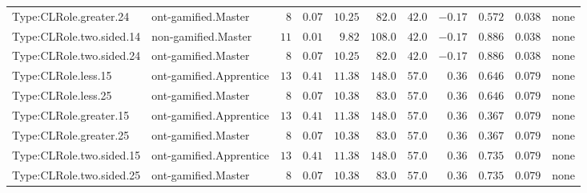 \documentclass[6pt,a4paper]{article}
\begin{document}
{\begin{longtable}{llrrrrrrrrl}
Type:CLRole.greater.24&ont-gamified.Master&$ 8$&$ 0.07$&$10.25$&$ 82.0$&$ 42.0$&$-0.17$&$0.572$&$0.038$&none\tabularnewline
Type:CLRole.two.sided.14&non-gamified.Master&$11$&$ 0.01$&$ 9.82$&$108.0$&$ 42.0$&$-0.17$&$0.886$&$0.038$&none\tabularnewline
Type:CLRole.two.sided.24&ont-gamified.Master&$ 8$&$ 0.07$&$10.25$&$ 82.0$&$ 42.0$&$-0.17$&$0.886$&$0.038$&none\tabularnewline
Type:CLRole.less.15&ont-gamified.Apprentice&$13$&$ 0.41$&$11.38$&$148.0$&$ 57.0$&$ 0.36$&$0.646$&$0.079$&none\tabularnewline
Type:CLRole.less.25&ont-gamified.Master&$ 8$&$ 0.07$&$10.38$&$ 83.0$&$ 57.0$&$ 0.36$&$0.646$&$0.079$&none\tabularnewline
Type:CLRole.greater.15&ont-gamified.Apprentice&$13$&$ 0.41$&$11.38$&$148.0$&$ 57.0$&$ 0.36$&$0.367$&$0.079$&none\tabularnewline
Type:CLRole.greater.25&ont-gamified.Master&$ 8$&$ 0.07$&$10.38$&$ 83.0$&$ 57.0$&$ 0.36$&$0.367$&$0.079$&none\tabularnewline
\newpage
Type:CLRole.two.sided.15&ont-gamified.Apprentice&$13$&$ 0.41$&$11.38$&$148.0$&$ 57.0$&$ 0.36$&$0.735$&$0.079$&none\tabularnewline
Type:CLRole.two.sided.25&ont-gamified.Master&$ 8$&$ 0.07$&$10.38$&$ 83.0$&$ 57.0$&$ 0.36$&$0.735$&$0.079$&none\tabularnewline
\hline
\end{longtable}}
\end{document}
